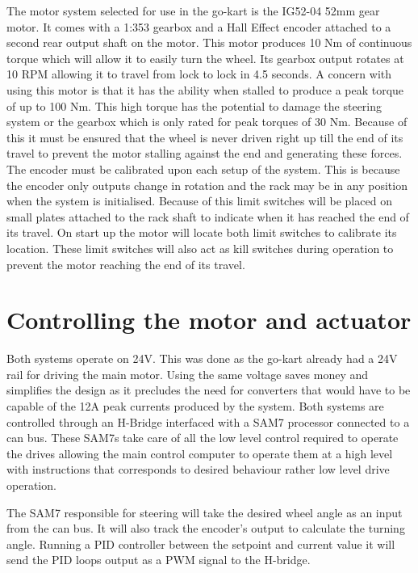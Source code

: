 The motor system selected for use in the go-kart is the IG52-04 52mm gear motor.
It comes with a 1:353 gearbox and a Hall Effect encoder attached to a second
rear output shaft on the motor. This motor produces 10 Nm of continuous torque
which will allow it to easily turn the wheel. Its gearbox output rotates at 10
RPM allowing it to travel from lock to lock in 4.5 seconds. A concern with using
this motor is that it has the ability when stalled to produce a peak torque of
up to 100 Nm. This high torque has the potential to damage the steering system
or the gearbox which is only rated for peak torques of 30 Nm. Because of this it
must be ensured that the wheel is never driven right up till the end of its
travel to prevent the motor stalling against the end and generating these
forces. The encoder must be calibrated upon each setup of the system. This is
because the encoder only outputs change in rotation and the rack may be in any
position when the system is initialised. Because of this limit switches will be
placed on small plates attached to the rack shaft to indicate when it has
reached the end of its travel. On start up the motor will locate both limit
switches to calibrate its location. These limit switches will also act as kill
switches during operation to prevent the motor reaching the end of its travel.

\section{Controlling the motor and actuator}

Both systems operate on 24V. This was done as the go-kart already had a 24V rail
for driving the main motor. Using the same voltage saves money and simplifies
the design as it precludes the need for converters that would have to be capable
of the 12A peak currents produced by the system. Both systems are controlled
through an H-Bridge interfaced with a SAM7 processor connected to a can bus.
These SAM7s take care of all the low level control required to operate the
drives allowing the main control computer to operate them at a high level with
instructions that corresponds to desired behaviour rather low level drive
operation.

The SAM7 responsible for steering will take the desired wheel angle as an input
from the can bus. It will also track the encoder's output to calculate the
turning angle. Running a PID controller between the setpoint and current value
it will send the PID loops output as a PWM signal to the H-bridge.

